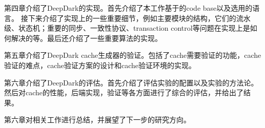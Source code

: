 第四章介绍了DeepDark的实现。首先介绍了本工作基于的code base以及选用的语言。 接下来介绍了实现上的一些重要细节，例如主要模块的结构，它们的流水级、状态机；重要的同步、一致性协议、transaction control等问题在实现上是如何解决的等。最后还介绍了一些重要算法的实现。

第五章介绍了DeepDark cache生成器的验证。包括了cache需要验证的功能，cache验证的难点，cache验证方案的设计和cache验证环境的实现。

第六章介绍了DeepDark的评估。首先介绍了评估实验的配置以及实验的方法论。然后对cache的性能，后端实现，验证等各方面进行了综合的评估，并给出了结果。

第六章对相关工作进行总结，并展望了下一步的研究方向。
